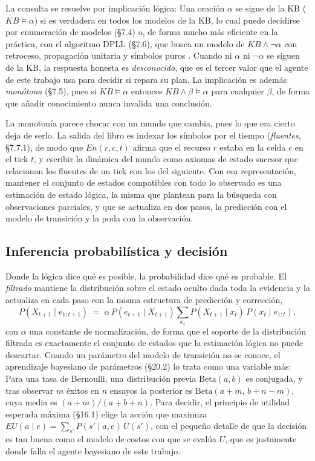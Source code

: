 La consulta se resuelve por implicación lógica: Una oración $\alpha$ se sigue de la KB ($\mathit{KB} \models \alpha$) si es verdadera en todos los modelos de la KB, lo cual puede decidirse por enumeración de modelos (§7.4) o, de forma mucho más eficiente en la práctica, con el algoritmo DPLL (§7.6), que busca un modelo de $\mathit{KB} \wedge \neg\alpha$ con retroceso, propagación unitaria y símbolos puros \parencite{davis1962machine}. Cuando ni $\alpha$ ni $\neg\alpha$ se siguen de la KB, la respuesta honesta es \emph{desconocido}, que es el tercer valor que el agente de este trabajo usa para decidir si repara su plan. La implicación es además \emph{monótona} (§7.5), pues si $\mathit{KB} \models \alpha$ entonces $\mathit{KB} \wedge \beta \models \alpha$ para cualquier $\beta$, de forma que añadir conocimiento nunca invalida una conclusión.

La monotonía parece chocar con un mundo que cambia, pues lo que era cierto deja de serlo. La salida del libro es indexar los símbolos por el tiempo (\emph{fluentes}, §7.7.1), de modo que $\mathit{En}(r,c,t)$ afirma que el recurso $r$ estaba en la celda $c$ en el tick $t$, y escribir la dinámica del mundo como axiomas de estado sucesor que relacionan los fluentes de un tick con los del siguiente. Con esa representación, mantener el conjunto de estados compatibles con todo lo observado es una estimación de estado lógica, la misma que \textcite[§4.4]{russellNorvig2020} plantean para la búsqueda con observaciones parciales, y que se actualiza en dos pasos, la predicción con el modelo de transición y la poda con la observación.

\subsection{Inferencia probabilística y decisión}

Donde la lógica dice qué es posible, la probabilidad dice qué es probable. El \emph{filtrado} \parencite[§14.2]{russellNorvig2020} mantiene la distribución sobre el estado oculto dada toda la evidencia y la actualiza en cada paso con la misma estructura de predicción y corrección,
\begin{equation}
  P(X_{t+1} \mid e_{1:t+1}) \;=\; \alpha\, P(e_{t+1} \mid X_{t+1}) \sum_{x_t} P(X_{t+1} \mid x_t)\, P(x_t \mid e_{1:t}),
\end{equation}
con $\alpha$ una constante de normalización, de forma que el soporte de la distribución filtrada es exactamente el conjunto de estados que la estimación lógica no puede descartar. Cuando un parámetro del modelo de transición no se conoce, el aprendizaje bayesiano de parámetros (§20.2) lo trata como una variable más: Para una tasa de Bernoulli, una distribución previa $\mathrm{Beta}(a,b)$ es conjugada, y tras observar $m$ éxitos en $n$ ensayos la posterior es $\mathrm{Beta}(a+m,\, b+n-m)$, cuya media es $(a+m)/(a+b+n)$. Para decidir, el principio de utilidad esperada máxima (§16.1) elige la acción que maximiza $\mathit{EU}(a \mid e) = \sum_{s'} P(s' \mid a, e)\, U(s')$, con el pequeño detalle de que la decisión es tan buena como el modelo de costos con que se evalúa $U$, que es justamente donde falla el agente bayesiano de este trabajo.

